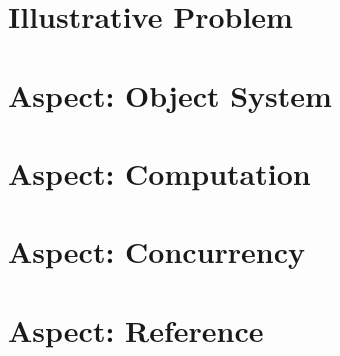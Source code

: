 \section{Illustrative Problem}

\section{Aspect: Object System}\label{sec:object-system}

\section{Aspect: Computation}\label{sec:computation}

\section{Aspect: Concurrency}\label{sec:concurrency}

\section{Aspect: Reference}\label{sec:reference}

